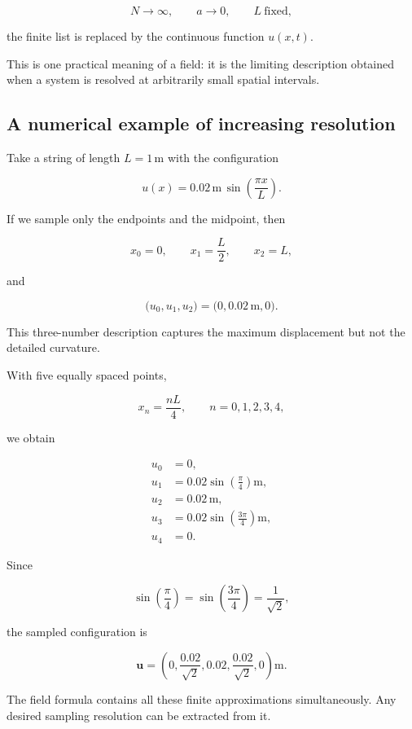 \[
N\longrightarrow\infty,
\qquad
a\longrightarrow 0,
\qquad
L\ \text{fixed},
\]

the finite list is replaced by the continuous function \(u(x,t)\).

This is one practical meaning of a field: it is the limiting description obtained when a system is resolved at arbitrarily small spatial intervals.

\subsection{A numerical example of increasing resolution}

Take a string of length \(L=1\,\mathrm{m}\) with the configuration

\[
u(x)=0.02\,\mathrm{m}\,
\sin\left(\frac{\pi x}{L}\right).
\]

If we sample only the endpoints and the midpoint, then

\[
x_{0}=0,
\qquad
x_{1}=\frac{L}{2},
\qquad
x_{2}=L,
\]

and

\[
\bigl(u_{0},u_{1},u_{2}\bigr)
=
\bigl(0,0.02\,\mathrm{m},0\bigr).
\]

This three-number description captures the maximum displacement but not the detailed curvature.

With five equally spaced points,

\[
x_{n}=\frac{nL}{4},
\qquad n=0,1,2,3,4,
\]

we obtain

\[
\begin{aligned}
u_{0}&=0,\\
u_{1}&=0.02\sin\left(\frac{\pi}{4}\right)\mathrm{m},\\
u_{2}&=0.02\,\mathrm{m},\\
u_{3}&=0.02\sin\left(\frac{3\pi}{4}\right)\mathrm{m},\\
u_{4}&=0.
\end{aligned}
\]

Since

\[
\sin\left(\frac{\pi}{4}\right)
=
\sin\left(\frac{3\pi}{4}\right)
=
\frac{1}{\sqrt{2}},
\]

the sampled configuration is

\[
\mathbf{u}
=
\left(
0,
\frac{0.02}{\sqrt{2}},
0.02,
\frac{0.02}{\sqrt{2}},
0
\right)\mathrm{m}.
\]

The field formula contains all these finite approximations simultaneously. Any desired sampling resolution can be extracted from it.

